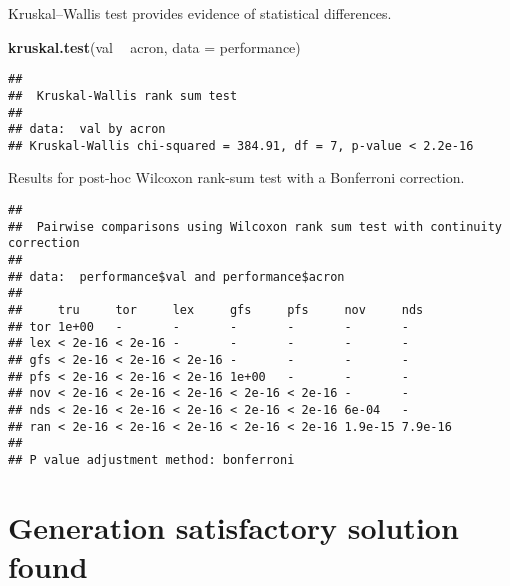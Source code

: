 \documentclass[]{book}
\newenvironment{Shaded}{\begin{snugshade}}{\end{snugshade}}
\newcommand{\DataTypeTok}[1]{\textcolor[rgb]{0.13,0.29,0.53}{#1}}
\newcommand{\KeywordTok}[1]{\textcolor[rgb]{0.13,0.29,0.53}{\textbf{#1}}}
\newcommand{\NormalTok}[1]{#1}
\newcommand{\OperatorTok}[1]{\textcolor[rgb]{0.81,0.36,0.00}{\textbf{#1}}}
\newcommand{\OtherTok}[1]{\textcolor[rgb]{0.56,0.35,0.01}{#1}}
\newcommand{\StringTok}[1]{\textcolor[rgb]{0.31,0.60,0.02}{#1}}
\begin{document}
Kruskal--Wallis test provides evidence of statistical differences.

\begin{Shaded}
\begin{Highlighting}[]
\KeywordTok{kruskal.test}\NormalTok{(val }\OperatorTok{~}\StringTok{ }\NormalTok{acron, }\DataTypeTok{data =}\NormalTok{ performance)}
\end{Highlighting}
\end{Shaded}

\begin{verbatim}
## 
##  Kruskal-Wallis rank sum test
## 
## data:  val by acron
## Kruskal-Wallis chi-squared = 384.91, df = 7, p-value < 2.2e-16
\end{verbatim}

Results for post-hoc Wilcoxon rank-sum test with a Bonferroni correction.

\begin{Shaded}
\end{Shaded}

\begin{verbatim}
## 
##  Pairwise comparisons using Wilcoxon rank sum test with continuity correction 
## 
## data:  performance$val and performance$acron 
## 
##     tru     tor     lex     gfs     pfs     nov     nds    
## tor 1e+00   -       -       -       -       -       -      
## lex < 2e-16 < 2e-16 -       -       -       -       -      
## gfs < 2e-16 < 2e-16 < 2e-16 -       -       -       -      
## pfs < 2e-16 < 2e-16 < 2e-16 1e+00   -       -       -      
## nov < 2e-16 < 2e-16 < 2e-16 < 2e-16 < 2e-16 -       -      
## nds < 2e-16 < 2e-16 < 2e-16 < 2e-16 < 2e-16 6e-04   -      
## ran < 2e-16 < 2e-16 < 2e-16 < 2e-16 < 2e-16 1.9e-15 7.9e-16
## 
## P value adjustment method: bonferroni
\end{verbatim}

\hypertarget{generation-satisfactory-solution-found}{%
\section{Generation satisfactory solution found}\label{generation-satisfactory-solution-found}}
\end{document}
